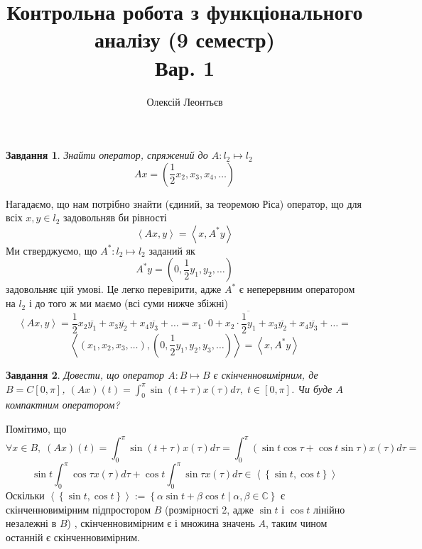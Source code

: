 \documentclass[12pt]{article} %
\title{Контрольна робота з функціонального аналізу (9 семестр)\\Вар. 1}
\author{Олексій Леонтьєв}
\newcommand{\mysca}[2]{\left<#1,#2\right>}
\newcommand{\mysetn}[2]{\left\{#1\mid #2\right\}}
\newtheorem{prob}{Завдання}
\begin{document}
\maketitle
\begin{prob}Знайти оператор, спряжений до $A:l_2\mapsto l_2$\[Ax=(\frac{1}{2}x_2,x_3,x_4,\dots)\]\end{prob}
	Нагадаємо, що нам потрібно знайти (єдиний, за теоремою Ріса) оператор, що для всіх $x,y\in l_2$ задовольняв би рівності
	\[\mysca{Ax}{y}=\mysca{x}{A^*y}\]
	Ми стверджуємо, що $A^*:l_2\mapsto l_2$ заданий як
	\[A^*y=(0,\frac{1}{2}y_1,y_2,\dots)\]
	задовольняє цій умові. Це легко перевірити, адже $A^*$ є неперервним оператором на $l_2$ і до того ж ми маємо (всі суми нижче збіжні)
	\[\mysca{Ax}{y}=
	\frac{1}{2}x_2\overline{y_1}+x_3\overline{y_2}+x_4\overline{y_3}+\dots=
	x_1\cdot 0+x_2\cdot\overline{\frac{1}{2}y_1}+x_3\overline{y_2}+x_4\overline{y_3}+\dots=\]
	\[\mysca{(x_1,x_2,x_3,\dots)}{(0,\frac{1}{2}y_1,y_2,y_3,\dots)}=\mysca{x}{A^*y}\]
\begin{prob}Довести, що оператор $A:B\mapsto B$ є скінченновимірним, де $B=C[0,\pi]$, $(Ax)(t)=\int_0^{\pi}\sin(t+\tau)x(\tau)d\tau,\;t\in[0,\pi]$.
	Чи буде $A$ компактним оператором?\end{prob}
	Помітимо, що
	\[\forall x\in B,\;(Ax)(t)=\int_0^{\pi}\sin(t+\tau)x(\tau)d\tau=\int_0^{\pi}\left(\sin t\cos\tau+\cos t\sin\tau\right)x(\tau)d\tau=\]
	\[\sin t\int_0^{\pi}\cos\tau x(\tau)d\tau+\cos t\int_0^{\pi}\sin\tau x(\tau)d\tau\in \left<\left\{\sin t,\cos t\right\}\right>\]
	Оскільки $\left<\left\{\sin t,\cos t\right\}\right>:=\mysetn{\alpha\sin t+\beta\cos t}{\alpha,\beta\in\mathbb{C}}$ є скінченновимірним
	підпростором $B$ (розмірності 2, адже $\sin t$ і $\cos t$ лінійно незалежні в $B$)
	, скінченновимірним є і множина значень $A$, таким чином останній є скінченновимірним.
\end{document}
